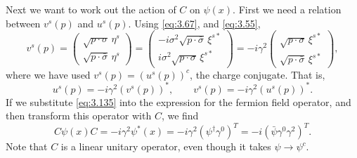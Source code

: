 Next we want to work out the action of $C$ on $\psi(x)$.  First we need a
relation between $v^s(p)$ and $u^s(p)$.  Using \eqref{eq:3.67}, and
\eqref{eq:3.55},
\begin{equation}
  v^s(p) = \begin{pmatrix}
    \sqrt{p\cdot\sigma}\,\eta^s\\
    \sqrt{p\cdot\bar{\sigma}}\,\eta^s
  \end{pmatrix}
  = \begin{pmatrix}
    -i\sigma^2\sqrt{p\cdot\bar{\sigma}}\,\xi^{s*}\\
    i\sigma^2\sqrt{p\cdot\sigma}\,\xi^{s*}
  \end{pmatrix}
  = -i\gamma^2\begin{pmatrix}
    \sqrt{p\cdot\sigma}\,\xi^{s*}\\
    \sqrt{p\cdot\bar{\sigma}}\,\xi^{s*}
  \end{pmatrix},
\end{equation}
where we have used $v^s(p) = (u^s(p))^{c}$, the charge conjugate.  That is,
\begin{equation}
  u^s(p) = -i\gamma^2(v^s(p))^{*},\qquad
  v^s(p) = -i\gamma^2(u^s(p))^{*}.
  \label{eq:3.135}
\end{equation}
If we substitute \eqref{eq:3.135} into the expression for the fermion field
operator, and then transform this operator with $C$, we find
\begin{equation}
  C\psi(x)C = -i\gamma^2\psi^{*}(x) = -i\gamma^2(\psi^{\dagger}\gamma^0)^T
    = -i(\bar{\psi}\gamma^0\gamma^2)^T .
  \label{eq:3.136}
\end{equation}
Note that $C$ is a linear unitary operator, even though it takes $\psi \to
\psi^{c}$.


